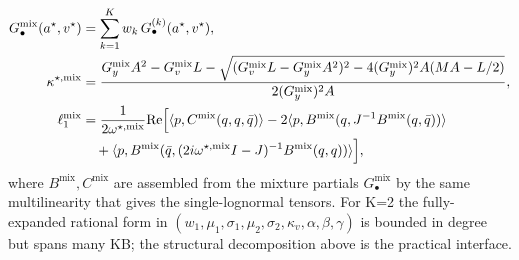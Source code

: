 \begin{align}
G^{\mathrm{mix}}_{\bullet}(a^\star, v^\star)
  &= \sum_{k=1}^{K} w_k \, G^{(k)}_{\bullet}(a^\star, v^\star),\\
\kappa^{\star,\mathrm{mix}}
  &= \frac{G^{\mathrm{mix}}_y A^2 - G^{\mathrm{mix}}_v L
       - \sqrt{(G^{\mathrm{mix}}_v L - G^{\mathrm{mix}}_y A^2)^2
       - 4 (G^{\mathrm{mix}}_y)^2 A (M A - L/2)}}
      {2 (G^{\mathrm{mix}}_y)^2 A},\\
\ell_1^{\mathrm{mix}}
  &= \frac{1}{2\omega^{\star,\mathrm{mix}}} \mathrm{Re}\Bigl[
       \langle p, C^{\mathrm{mix}}(q,q,\bar q)\rangle
       - 2\langle p, B^{\mathrm{mix}}(q, J^{-1} B^{\mathrm{mix}}(q, \bar q))\rangle\\
  &\quad + \langle p, B^{\mathrm{mix}}(\bar q,
         (2i\omega^{\star,\mathrm{mix}} I - J)^{-1} B^{\mathrm{mix}}(q, q))\rangle
       \Bigr],
\end{align}
where $B^{\mathrm{mix}}, C^{\mathrm{mix}}$ are assembled from the
mixture partials $G^{\mathrm{mix}}_{\bullet}$ by the same
multilinearity that gives the single-lognormal tensors. For K=2 the
fully-expanded rational form in $(w_1, \mu_1, \sigma_1, \mu_2, \sigma_2,
\kappa_v, \alpha, \beta, \gamma)$ is bounded in degree but spans many
KB; the structural decomposition above is the practical interface.
